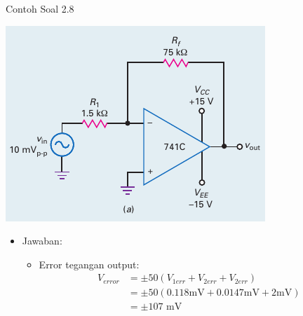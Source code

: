 \begin{frame}[t]{Contoh Soal 2.8}
	\begin{multicols}{2}
		\begin{center}
			\includegraphics[width=\linewidth]{gambar/fig-16.17a}
		\end{center}
		\columnbreak
		\begin{itemize}
			\item Jawaban:
			\begin{itemize}
				
				\item Error tegangan output:
				\begin{align*}
					V_{error} &= \pm 50 (V_{1err} + V_{2err} + V_{2err}) \\
					&= \pm 50 (0.118 \text{mV} + 0.0147 \text{mV} + 2 \text{mV}) \\
					&= \pm 107 \text{ mV}
				\end{align*}
			\end{itemize}
		\end{itemize}
	\end{multicols}
\end{frame}

